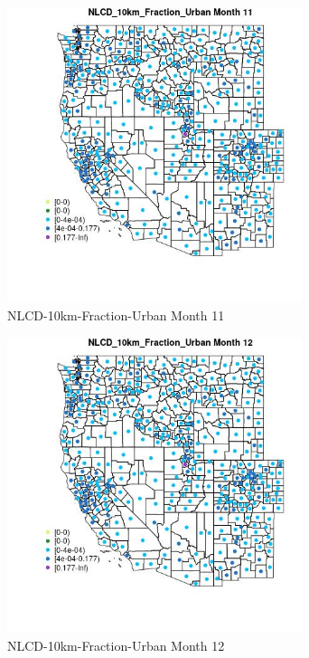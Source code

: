 \begin{figure} 
\centering  
\includegraphics[width=0.77\textwidth]{Code_Outputs/df_report_ML_predictors_CountyCentroid_Locations_Dates_2008-01-01to2018-12-31_MapObsMo11NLCD_10km_Fraction_Urban.jpg} 
\caption{\label{fig:df_report_ML_predictors_CountyCentroid_Locations_Dates_2008-01-01to2018-12-31MapObsMo11NLCD_10km_Fraction_Urban}NLCD-10km-Fraction-Urban Month 11} 
\end{figure} 
 

\begin{figure} 
\centering  
\includegraphics[width=0.77\textwidth]{Code_Outputs/df_report_ML_predictors_CountyCentroid_Locations_Dates_2008-01-01to2018-12-31_MapObsMo12NLCD_10km_Fraction_Urban.jpg} 
\caption{\label{fig:df_report_ML_predictors_CountyCentroid_Locations_Dates_2008-01-01to2018-12-31MapObsMo12NLCD_10km_Fraction_Urban}NLCD-10km-Fraction-Urban Month 12} 
\end{figure} 
 

